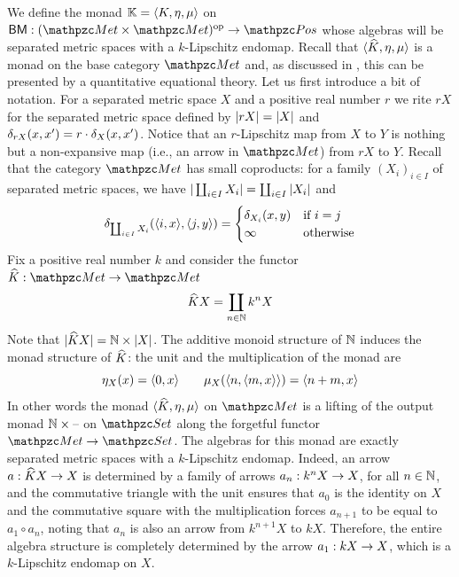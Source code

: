 \begin{example}
We define the monad $\mathbb{K} = {\langle K,\eta,\mu \rangle }$ on $\fun{\BM}{\bop\Met}{\Pos}$ whose algebras will be separated metric spaces with a $k$-Lipschitz endomap. 
Recall that ${\langle \widehat{K},\eta,\mu \rangle }$ is a monad on the base category $\Met$ and, as discussed in \cite{Adamek22}, this can be presented by a quantitative equational theory. 
% 
Let us first introduce a bit of notation. 
For a separated metric space $X$ and a positive real number $r$ we rite 
$rX$ for the separated metric space defined by 
$|rX| = |X|$ and $\delta_{rX}(x,x') = r\cdot\delta_X(x,x')$. 
Notice that an $r$-Lipschitz map from $X$ to $Y$ is nothing but a  non-expansive map (i.e., an arrow in $\Met$) from $rX$ to $Y$. 
Recall that the category $\Met$ has small coproducts: 
for a family $(X_i)_{i \in I}$ of separated metric spaces, we have 
$|\coprod_{i \in I} X_i| = \coprod_{i \in I} |X_i|$ and 
\[
\delta_{\coprod_{i \in I} X_i}({\langle i,x \rangle },{\langle j,y \rangle }) = 
\begin{cases}
  \delta_{X_i}(x,y) & \text{if } i = j \\
  \infty & \text{otherwise}
\end{cases}
\]
Fix a positive real number $k$ and  consider the functor $\fun{\fn{K}}{\Met}{\Met}$ 
\[ \widehat{K} X = \coprod_{n \in \mathbb{N}} k^nX \] 
Note that $|\widehat{K}X| = \mathbb{N} \times |X|$. The additive monoid structure of $\mathbb{N}$ induces the monad structure of $\widehat{K}$: the unit and the multiplication of the monad are 
\[
\eta_X(x) = {\langle 0,x \rangle } \qquad 
\mu_X({\langle n, {\langle m,x \rangle } \rangle }) = {\langle n + m, x \rangle } 
\]
In other words the monad ${\langle \widehat{K},\eta,\mu \rangle }$ on $\Met$ is a lifting of the output monad $\N \times \blank$ on $\Set$ along the forgetful functor $\Met\to\Set$. 
% 
The algebras for this monad are exactly separated metric spaces with a $k$-Lipschitz endomap. 
Indeed, an arrow $\fun{a}{\fn{K}X}{X}$ is determined by a family of arrows 
$\fun{a_n}{k^nX}{X}$, for all $n \in \mathbb{N}$, and 
the commutative triangle with the unit ensures that $a_0$ is the identity on $X$  and 
the commutative square with the multiplication forces $a_{n+1}$ to be equal to $a_1 \circ a_n$, noting that 
$a_n$ is also an arrow from $k^{n+1}X$ to $kX$. 
Therefore, the entire algebra structure is completely determined by the arrow $\fun{a_1}{kX}{X}$, which is a $k$-Lipschitz endomap on $X$. 


\end{example}
